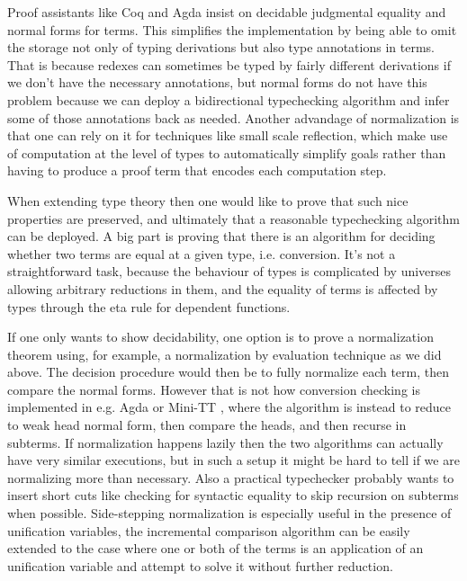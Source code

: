 \documentclass{book}
\begin{document}
Proof assistants like Coq and Agda insist on decidable
judgmental equality and normal forms for terms. This simplifies the
implementation by being able to omit the storage not only of typing
derivations but also type annotations in terms. That is because
redexes can sometimes be typed by fairly different derivations if we
don't have the necessary annotations, but normal forms do not have
this problem because we can deploy a bidirectional typechecking
algorithm and infer some of those annotations back as needed. Another
advandage of normalization is that one can rely on it for techniques
like small scale reflection, which make use of computation at the
level of types to automatically simplify goals rather than having to
produce a proof term that encodes each computation step.

When extending type theory then one would like to prove that such nice
properties are preserved, and ultimately that a reasonable
typechecking algorithm can be deployed. A big part is proving that
there is an algorithm for deciding whether two terms are equal at a
given type, i.e. conversion. It's not a straightforward task, because
the behaviour of types is complicated by universes allowing arbitrary
reductions in them, and the equality of terms is affected by types
through the eta rule for dependent functions.

If one only wants to show decidability, one option is to prove a
normalization theorem using, for example, a normalization by
evaluation technique as we did above. The decision procedure would
then be to fully normalize each term, then compare the normal forms.
However that is not how conversion checking is implemented in
e.g. Agda or Mini-TT \cite{norell:PhD,minitt}, where the algorithm is instead to reduce
to weak head normal form, then compare the heads, and then recurse in
subterms. If normalization happens lazily then the two algorithms can
actually have very similar executions, but in such a setup it might be
hard to tell if we are normalizing more than necessary. Also a
practical typechecker probably wants to insert short cuts like
checking for syntactic equality to skip recursion on subterms when
possible. Side-stepping normalization is especially useful in the
presence of unification variables, the incremental comparison
algorithm can be easily extended to the case where one or both of the
terms is an application of an unification variable and attempt to
solve it without further reduction.
\end{document}
